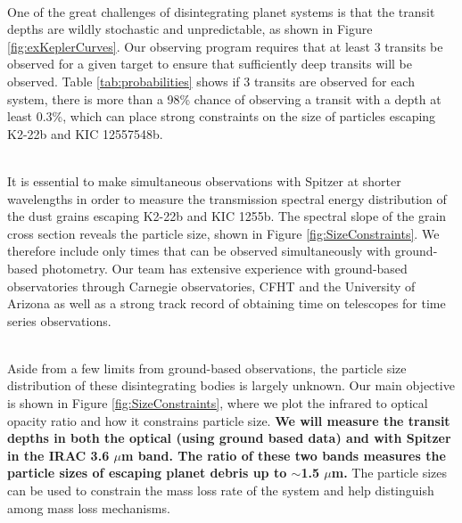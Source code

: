 \documentclass[letterpaper,12pt]{article}
\begin{document}
\\
One of the great challenges of disintegrating planet systems is that the transit depths are wildly stochastic and unpredictable, as shown in Figure \ref{fig:exKeplerCurves}.
Our observing program requires that at least 3 transits be observed for a given target to ensure that sufficiently deep transits will be observed.
Table \ref{tab:probabilities} shows if 3 transits are observed for each system, there is more than a 98\% chance of observing a transit with a depth at least 0.3\%, which can place strong constraints on the size of particles escaping K2-22b and KIC 12557548b.\newline

\\
It is essential to make simultaneous observations with Spitzer at shorter wavelengths in order to measure the transmission spectral energy distribution of the dust grains escaping K2-22b and KIC 1255b.
The spectral slope of the grain cross section reveals the particle size, shown in Figure \ref{fig:SizeConstraints}.
We therefore include only times that can be observed simultaneously with ground-based photometry.
Our team has extensive experience with ground-based observatories through Carnegie observatories, CFHT and the University of Arizona as well as a strong track record of obtaining time on telescopes for time series observations.\newline

\\
Aside from a few limits from ground-based observations, the particle size distribution of these disintegrating bodies is largely unknown.
Our main objective is shown in Figure \ref{fig:SizeConstraints}, where we plot the infrared to optical opacity ratio and how it constrains particle size.
\textbf{We will measure the transit depths in both the optical (using ground based data) and with Spitzer in the IRAC 3.6 $\mu$m band.
The ratio of these two bands measures the particle sizes of escaping planet debris up to $\sim$1.5 $\mu$m.}
The particle sizes can be used to constrain the mass loss rate of the system and help distinguish among mass loss mechanisms.



\end{document}
